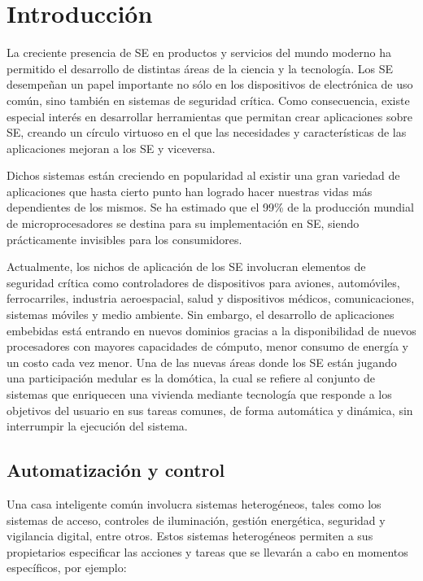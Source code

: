 \documentclass[journal]{IEEEtran}
\begin{document}
\section{Introducción}
\label{sec:introduccion}

La creciente presencia de SE en productos y servicios del mundo moderno ha permitido el desarrollo de distintas áreas de la ciencia y la tecnología.
Los SE desempeñan un papel importante no sólo en los dispositivos de electrónica de uso común, sino también en sistemas de seguridad crítica. 
Como consecuencia, existe especial interés en desarrollar herramientas que permitan crear aplicaciones sobre SE, creando un círculo virtuoso en el que las necesidades y características de las aplicaciones mejoran a los SE y viceversa.

Dichos sistemas están creciendo en popularidad al existir una gran variedad de aplicaciones que hasta cierto punto han logrado hacer nuestras vidas más dependientes de los mismos.
Se ha estimado que el 99\% \cite{Burns2005} de la producción mundial de microprocesadores se destina para su implementación en SE, siendo prácticamente invisibles para los consumidores.

Actualmente, los nichos de aplicación de los SE involucran elementos de seguridad crítica como controladores de dispositivos para aviones, automóviles, ferrocarriles, industria aeroespacial, salud y dispositivos médicos, comunicaciones, sistemas móviles y medio ambiente.
Sin embargo, el desarrollo de aplicaciones embebidas está entrando en nuevos dominios gracias a la disponibilidad de nuevos procesadores con mayores capacidades de cómputo, menor consumo de energía y un costo cada vez menor.
Una de las nuevas áreas donde los SE están jugando una participación medular es la domótica, la cual se refiere al conjunto de sistemas que enriquecen una vivienda mediante tecnología que responde a los objetivos del usuario en sus tareas comunes, de forma automática y dinámica, sin interrumpir la ejecución del sistema.

\subsection{Automatización y control}
Una casa inteligente común involucra sistemas heterogéneos, tales como los sistemas de acceso, controles de iluminación, gestión energética, seguridad y vigilancia digital, entre otros.
Estos sistemas heterogéneos permiten a sus propietarios especificar las acciones y tareas que se llevarán a cabo en momentos específicos, por ejemplo:
\end{document}
